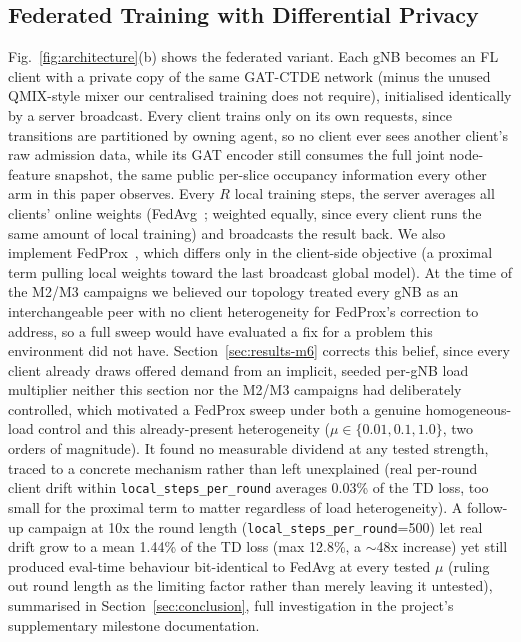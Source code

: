 \documentclass[journal]{IEEEtran}
\begin{document}
\subsection{Federated Training with Differential Privacy}
Fig.~\ref{fig:architecture}(b) shows the federated variant. Each gNB
becomes an FL client with a private copy of the same GAT-CTDE network
(minus the unused QMIX-style mixer our centralised training does not
require), initialised identically by a server broadcast. Every client
trains only on its own requests, since transitions are partitioned by
owning agent, so no client ever sees another client's raw admission
data, while its GAT encoder still consumes the full joint
node-feature snapshot, the same public per-slice occupancy information
every other arm in this paper observes. Every $R$ local training steps,
the server averages all clients' online weights (FedAvg~\cite{fedavg};
weighted equally, since every client runs the same amount of local
training) and broadcasts the result back. We also implement
FedProx~\cite{fedprox}, which differs only in the client-side objective (a proximal term
pulling local weights toward the last broadcast global model). At the
time of the M2/M3 campaigns we believed our topology treated every gNB
as an interchangeable peer with no client heterogeneity for FedProx's
correction to address, so a full sweep would have evaluated a fix for a
problem this environment did not have. Section~\ref{sec:results-m6}
corrects this belief, since every client already draws offered demand from
an implicit, seeded per-gNB load multiplier neither this section nor
the M2/M3 campaigns had deliberately controlled, which motivated a
FedProx sweep under both a genuine homogeneous-load control and this
already-present heterogeneity ($\mu \in \{0.01, 0.1, 1.0\}$, two orders
of magnitude). It found no measurable dividend at any tested strength,
traced to a concrete mechanism rather than left unexplained (real
per-round client drift within \texttt{local\_steps\_per\_round}
averages 0.03\% of the TD loss, too small for the proximal term to
matter regardless of load heterogeneity). A follow-up campaign at 10x
the round length (\texttt{local\_steps\_per\_round}=500) let real drift
grow to a mean 1.44\% of the TD loss (max 12.8\%, a $\sim$48x increase)
yet still produced eval-time behaviour bit-identical to FedAvg at
every tested $\mu$ (ruling out round length as the limiting factor
rather than merely leaving it untested), summarised in
Section~\ref{sec:conclusion}, full investigation in the project's
supplementary milestone documentation.
\end{document}
